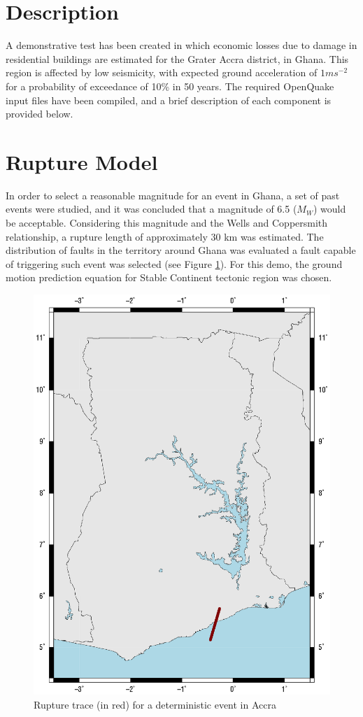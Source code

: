 \section{Description}
A demonstrative test has been created in which economic losses due 
to damage in residential buildings are estimated for the Grater Accra 
district, in Ghana. This region is affected by low seismicity, with 
expected ground acceleration of $1 ms^{-2}$ for a probability of 
exceedance of 10\% in 50 years. The required OpenQuake input files
have been compiled, and a brief description of each component is 
provided below. 
%
\section{Rupture Model}
In order to select a reasonable magnitude for an event in Ghana, 
a set of past events were studied, and it was concluded that a
magnitude of 6.5 ($M_W$) would be acceptable. Considering this
magnitude and the Wells and Coppersmith relationship, a rupture
length of approximately 30 km was estimated. The distribution of 
faults in the territory around Ghana was evaluated a fault capable
of triggering such event was selected (see Figure \ref{fig:rupture}). 
For this demo, the ground motion prediction equation for Stable 
Continent tectonic region \citep{toro2002} was chosen. 
%
\begin{figure}[htb]
	\centering
		\includegraphics{./figures/rupture.eps}
	\caption{Rupture trace (in red) for a deterministic event in Accra}
	\label{fig:rupture}
\end{figure}
%
